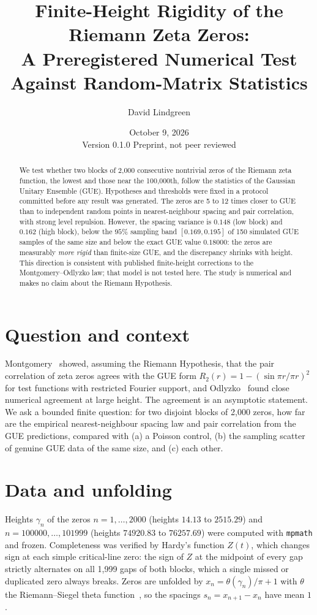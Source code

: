 \documentclass[11pt]{article}
\title{Finite-Height Rigidity of the Riemann Zeta Zeros:\\
A Preregistered Numerical Test Against Random-Matrix Statistics}
\author{David Lindgreen}
\date{October 9, 2026 \\[2pt] \small Version 0.1.0 \quad Preprint, not peer reviewed}
\begin{document}
\maketitle

\begin{abstract}
We test whether two blocks of 2{,}000 consecutive nontrivial zeros of the Riemann zeta function, the
lowest and those near the 100{,}000th, follow the statistics of the Gaussian Unitary Ensemble (GUE).
Hypotheses and thresholds were fixed in a protocol committed before any result was generated. The zeros are
5 to 12 times closer to GUE than to independent random points in nearest-neighbour spacing and pair
correlation, with strong level repulsion. However, the spacing variance is $0.148$ (low block) and
$0.162$ (high block), below the $95\%$ sampling band $[0.169, 0.195]$ of 150 simulated GUE samples of the same
size and below the exact GUE value $0.18000$: the zeros are measurably \emph{more rigid} than finite-size GUE,
and the discrepancy shrinks with height. This direction is consistent with published finite-height corrections
to the Montgomery--Odlyzko law; that model is not tested here. The study is numerical and makes no claim about the
Riemann Hypothesis.
\end{abstract}

\section{Question and context}
Montgomery~\cite{montgomery1973} showed, assuming the Riemann Hypothesis, that the pair correlation of
zeta zeros agrees with the GUE form $R_2(r)=1-(\sin\pi r/\pi r)^2$ for test functions with restricted Fourier
support, and Odlyzko~\cite{odlyzko1987} found close numerical agreement at large height. The agreement is an
asymptotic statement. We ask a bounded finite question: for two disjoint blocks of 2{,}000 zeros, how far are
the empirical nearest-neighbour spacing law and pair correlation from the GUE predictions, compared with
(a) a Poisson control, (b) the sampling scatter of genuine GUE data of the same size, and (c) each other.

\section{Data and unfolding}
Heights $\gamma_n$ of the zeros $n=1,\dots,2000$ (heights $14.13$ to $2515.29$) and $n=100000,\dots,101999$
(heights $74920.83$ to $76257.69$) were computed with \texttt{mpmath} and frozen.
Completeness was verified by Hardy's function $Z(t)$, which changes sign at each simple critical-line zero: the
sign of $Z$ at the midpoint of every gap strictly alternates on all 1{,}999 gaps of both blocks, which a single
missed or duplicated zero always breaks. Zeros are unfolded by $x_n=\theta(\gamma_n)/\pi+1$ with $\theta$ the
Riemann--Siegel theta function~\cite{edwards1974}, so the spacings $s_n=x_{n+1}-x_n$ have mean $1$.
\end{document}
